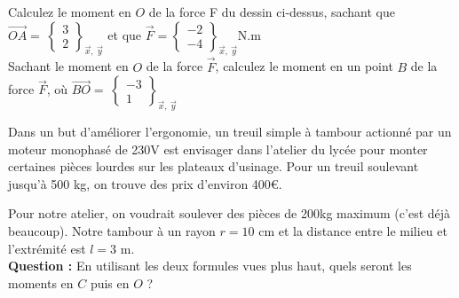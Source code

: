 \documentclass[
	11pt, %
	fleqn, %
	a4paper, %
]{LegrandOrangeBook}
\begin{document}
\begin{Exercice}
    Calculez le moment en $O$ de la force F du dessin ci-dessus, sachant que $\overrightarrow{OA}=\ \begin{Bmatrix} 3\\ 2 \end{Bmatrix}_{\vec{x} ,\ \vec{y}}$ et que $\Vec{F}=\begin{Bmatrix} -2\\ -4 \end{Bmatrix}_{\vec{x} ,\ \vec{y}}$N.m \\

Sachant le moment en $O$ de la force $\Vec{F}$, calculez le moment en un point $B$ de la force $\Vec{F}$, où $\overrightarrow{BO}=\ \begin{Bmatrix} -3\\ 1 \end{Bmatrix}_{\vec{x} ,\ \vec{y}}$

\end{Exercice}



\begin{Exercice}\label{treuil2}
Dans un but d'améliorer l'ergonomie, un treuil simple à tambour actionné par un moteur monophasé de 230V est envisager dans l'atelier du lycée pour monter certaines pièces lourdes sur les plateaux d'usinage. Pour un treuil soulevant jusqu'à 500 kg, on trouve des prix d'environ 400\euro.

\begin{figure}[H]  %
	\centering %
\end{figure}

Pour notre atelier, on voudrait soulever des pièces de 200kg maximum (c'est déjà beaucoup). Notre tambour à un rayon $r=10$ cm et la distance entre le milieu et l'extrémité est $l=3$ m.\\

\textbf{Question :} En utilisant les deux formules vues plus haut, quels seront les moments en $C$ puis en $O$ ?\\


\end{Exercice}
\end{document}

